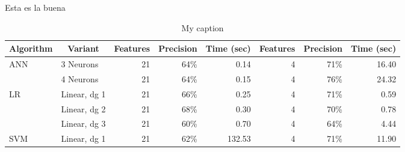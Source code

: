 \documentclass[10pt,letterpaper,oneside]{article}
\begin{document}
Esta es la buena


\begin{table}[]
	\centering
	\caption{My caption}
	\label{my-label}
	\begin{tabular}{llrrrrrr}
		\hline
		\multicolumn{1}{c}{\textbf{Algorithm}}  & \multicolumn{1}{c}{\textbf{Variant}} & \multicolumn{1}{p{1.5cm}}{\textbf{Features}} & \multicolumn{1}{c}{\textbf{Precision}} & \multicolumn{1}{p{1cm}}{\textbf{Time (sec)}} & \multicolumn{1}{p{1.5cm}}{\textbf{Features}} & \textbf{Precision} & \multicolumn{1}{p{1cm}}{\textbf{Time (sec)}} \\ \hline
		\multirow{2}{*}{ANN}         & 3 Neurons                            & 21                                             & 64\%                                   & 0.14                                             & 4                          & 71\%               & 16.40                        \\
		& 4 Neurons                            & 21                                             & 64\%                                   & 0.15                                             & 4                          & 76\%               & 24.32                        \\ \hline
		\multirow{3}{*}{LR}    & Linear, dg 1                     & 21                                             & 66\%                                   & 0.25                                             & 4                          & 71\%               & 0.59                         \\
		& Linear, dg 2                     & 21                                             & 68\%                                   & 0.30                                             & 4                          & 70\%               & 0.78                         \\
		& Linear, dg 3                     & 21                                             & 60\%                                   & 0.70                                             & 4                          & 64\%               & 4.44                         \\ \hline
		\multirow{4}{*}{SVM} & Linear, dg 1                     & 21                                             & 62\%                                   & 132.53                                           & 4                          & 71\%               & 11.90                        \\

\end{tabular}
\end{table}
\end{document}
